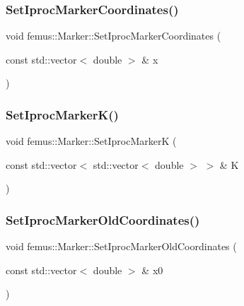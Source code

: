 \subsubsection{\texorpdfstring{Set\+Iproc\+Marker\+Coordinates()}{SetIprocMarkerCoordinates()}}
{\footnotesize\ttfamily void femus\+::\+Marker\+::\+Set\+Iproc\+Marker\+Coordinates (\begin{DoxyParamCaption}\item[{const std\+::vector$<$ double $>$ \&}]{x }\end{DoxyParamCaption})\hspace{0.3cm}{\ttfamily [inline]}}

\mbox{\label{classfemus_1_1_marker_ad09bfae9f0fa2299502e8959d8fe0fc3}} 
\subsubsection{\texorpdfstring{Set\+Iproc\+Marker\+K()}{SetIprocMarkerK()}}
{\footnotesize\ttfamily void femus\+::\+Marker\+::\+Set\+Iproc\+MarkerK (\begin{DoxyParamCaption}\item[{const std\+::vector$<$ std\+::vector$<$ double $>$ $>$ \&}]{K }\end{DoxyParamCaption})\hspace{0.3cm}{\ttfamily [inline]}}

\mbox{\label{classfemus_1_1_marker_a1d02fb5c2c0fe7dbc343cfb6205beae9}} 
\subsubsection{\texorpdfstring{Set\+Iproc\+Marker\+Old\+Coordinates()}{SetIprocMarkerOldCoordinates()}}
{\footnotesize\ttfamily void femus\+::\+Marker\+::\+Set\+Iproc\+Marker\+Old\+Coordinates (\begin{DoxyParamCaption}\item[{const std\+::vector$<$ double $>$ \&}]{x0 }\end{DoxyParamCaption})\hspace{0.3cm}{\ttfamily [inline]}}

